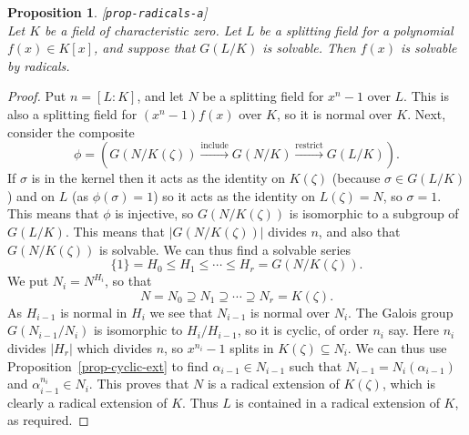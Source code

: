 \documentclass{amsart}
\newcommand{\lbl}[1]{\label{#1}\textup{[\texttt{#1}]}\ \\}
\newcommand{\lbl}{\label}
\newcommand{\al}        {\alpha}
\newcommand{\zt}        {\zeta}
\newcommand{\sg}        {\sigma}
\newcommand{\sse}       {\subseteq}
\newcommand{\xra}       {\xrightarrow}
\renewcommand{\:}{\colon}
\newtheorem{proposition}[theorem]{Proposition}
\theoremstyle{definition}
\begin{document}
\begin{proposition}\lbl{prop-radicals-a}
 Let $K$ be a field of characteristic zero.  Let $L$ be a splitting
 field for a polynomial $f(x)\in K[x]$, and suppose that $G(L/K)$ is
 solvable.  Then $f(x)$ is solvable by radicals.
\end{proposition}
\begin{proof}
 Put $n=[L:K]$, and let $N$ be a splitting field for $x^n-1$ over $L$.
 This is also a splitting field for $(x^n-1)f(x)$ over $K$, so it is
 normal over $K$.   Next, consider the composite 
 \[ \phi = (G(N/K(\zt)) \xra{\text{include}} G(N/K)
              \xra{\text{restrict}} G(L/K)).
 \]
 If $\sg$ is in the kernel then it acts as the identity on $K(\zt)$
 (because $\sg\in G(L/K)$) and on $L$ (as $\phi(\sg)=1$) so it acts
 as the identity on $L(\zt)=N$, so $\sg=1$.  This means that $\phi$ is
 injective, so $G(N/K(\zt))$ is isomorphic to a subgroup of $G(L/K)$.
 This means that $|G(N/K(\zt))|$ divides $n$, and also that
 $G(N/K(\zt))$ is solvable.  We can thus find a solvable series 
 \[ \{1\} = H_0 \leq H_1 \leq \dotsb \leq H_r = G(N/K(\zt)). \]
 We put $N_i=N^{H_i}$, so that 
 \[ N = N_0 \supseteq N_1 \supseteq \dotsb \supseteq N_r = K(\zt).
 \]
 As $H_{i-1}$ is normal in $H_i$ we see that $N_{i-1}$ is normal over
 $N_i$.  The Galois group $G(N_{i-1}/N_i)$ is isomorphic to
 $H_i/H_{i-1}$, so it is cyclic, of order $n_i$ say.  Here $n_i$
 divides $|H_r|$ which divides $n$, so $x^{n_i}-1$ splits in
 $K(\zt)\sse N_i$.  We can thus use Proposition~\ref{prop-cyclic-ext}
 to find $\al_{i-1}\in N_{i-1}$ such that $N_{i-1}=N_i(\al_{i-1})$ and
 $\al_{i-1}^{n_i}\in N_i$.  This proves that $N$ is a radical
 extension of $K(\zt)$, which is clearly a radical extension of $K$.
 Thus $L$ is contained in a radical extension of $K$, as required.
\end{proof}
\end{document}
